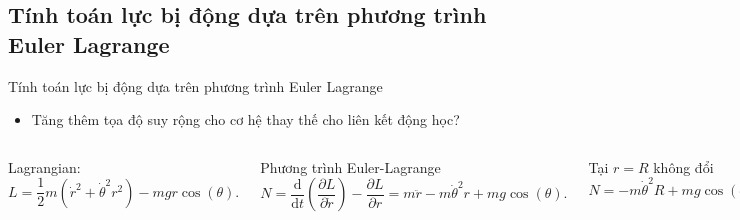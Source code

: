 \subsection{Tính toán lực bị động dựa trên phương trình Euler Lagrange}

\begin{frame}{Tính toán lực bị động dựa trên phương trình Euler Lagrange}
\vspace{-4mm}
\begin{itemize}
    \item Tăng thêm tọa độ suy rộng cho cơ hệ thay thế cho liên kết động học? \cite{morin2008introduction}
\end{itemize}
\begin{columns}
    Lagrangian:
    \begin{equation}
        L = \frac{1}{2} m \left( \dot{r}^2 + \dot{\theta}^2 r^2 \right) -mg r \cos \left( \theta \right).
    \end{equation}

    Phương trình Euler-Lagrange
    \begin{equation}
        N = \frac{\mathrm{d}}{\mathrm{d} t} \left( \frac{\partial L}{\partial \dot{r}} \right) - \frac{\partial L}{\partial r} = m \ddot{r} - m \dot{\theta}^2 r + mg \cos \left( \theta \right).
    \end{equation}

    Tại \(r=R\) không đổi
    \begin{equation}
        N = -m \dot{\theta}^2 R + mg \cos \left( \theta \right).
    \end{equation}
    
    \begin{figure}
        \centering
        \includegraphics[width=0.9\linewidth]{Figures/Passive_force.pdf}
        \caption{Lực liên kết bị động \(\mathbf{N}\) được tính nhờ khảo sát tọa độ suy rộng \(r\).}
        \label{fig:Passive_force}
    \end{figure}

\end{columns}
\end{frame}

